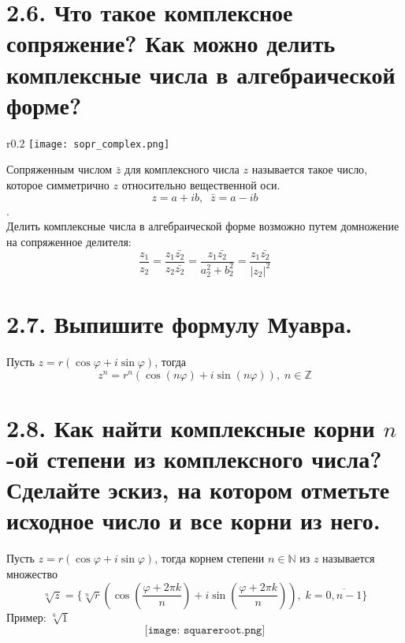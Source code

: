 \documentclass{article}
\begin{document}
\section*{\LARGE 2.6. Что такое комплексное сопряжение? Как можно делить комплексные числа в алгебраической форме? }

\begin{wrapfigure}{r}{0.2\textwidth}
    \centering
    \texttt{[image: sopr\_complex.png]}
\end{wrapfigure}
Сопряженным числом $\bar{z}$ для комплексного числа $z$ называется такое число, которое симметрично $z$ относительно вещественной оси.
$$z = a + ib, \;\; \bar{z} = a - ib$$. 
$$ $$ 
\newline Делить комплексные числа в алгебраической форме возможно путем домножение на сопряженное делителя:
$$
\frac{z_1}{z_2} = \frac{z_1 \bar{z_2}}{z_2 \bar{z_2}} = \frac{z_1 \bar{z_2}}{a_2^2 + b_2^2} = \frac{z_1 \bar{z_2}}{|z_2|^2}
$$

\section*{\LARGE 2.7. Выпишите формулу Муавра.  }

Пусть $z = r(\cos{\varphi} + i\sin{\varphi})$, тогда
$$ z^n =  r^n(\cos{(n\varphi)} + i\sin{(n\varphi)}),\; n \in \mathbb{Z}$$

\section*{\LARGE 2.8. Как найти комплексные корни $n$-ой степени из комплексного числа? Сделайте эскиз, на котором отметьте исходное число и все корни из него.  }

Пусть $z = r(\cos{\varphi} + i\sin{\varphi})$, тогда корнем степени $n \in \mathbb{N}$ из $z$ называется множество
$$
\sqrt[n]{z} = \{\sqrt[n]{r}\left(\cos{\left(\frac{\varphi + 2\pi k}{n}\right) + i\sin{\left(\frac{\varphi + 2\pi k}{n}\right)}}\right),\; k = \overline{0, n-1}\}
$$
Пример: $\sqrt[6]{1}$
$$ \texttt{[image: squareroot.png]}$$
\end{document}
